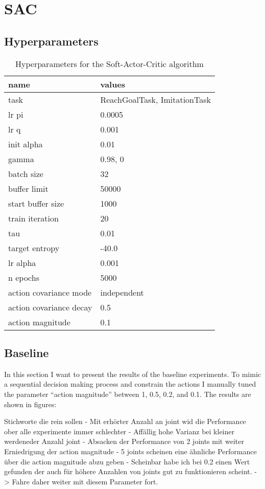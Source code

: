 \section{SAC}

\subsection{Hyperparameters}

\begin{table}[]
    \centering
    \begin{tabular}{l|l}
         name & values \\
         \hline
         task & ReachGoalTask, ImitationTask \\
         lr pi & 0.0005 \\
         lr q & 0.001 \\
         init alpha & 0.01 \\
         gamma & 0.98, 0  \\
         batch size & 32 \\
         buffer limit & 50000 \\
         start buffer size & 1000 \\
         train iteration & 20 \\
         tau & 0.01 \\ 
         target entropy & -40.0 \\
         lr alpha & 0.001 \\
         n epochs & 5000 \\
         action covariance mode & independent \\
         action covariance decay &  0.5 \\
         action magnitude & 0.1 \\
        \end{tabular}
    \caption{Hyperparameters for the Soft-Actor-Critic algorithm}
    \label{tab:Hyperparameters}
\end{table}

\subsection{Baseline}

In this section I want to present the results of the baseline experiments. To mimic a sequential decision making process and constrain the actions I manually tuned the parameter ``action magnitude'' between 1, 0.5, 0.2, and 0.1. The results are shown in figures: \figref{}

Stichworte die rein sollen
- Mit erhörter Anzahl an joint wid die Performance ober alle experimente immer schlechter
- Affällig hohe Varianz bei kleiner werdeneder Anzahl joint
- Absacken der Performance von 2 joints mit weiter Erniedrigung der action magnitude
- 5 joints scheinen eine ähnliche Performance über die action magnitude abzu geben
- Scheinbar habe ich bei 0.2 einen Wert gefunden der auch für höhere Anzahlen von joints gut zu funktionieren scheint. -> Fahre daher weiter mit diesem Parameter fort.



